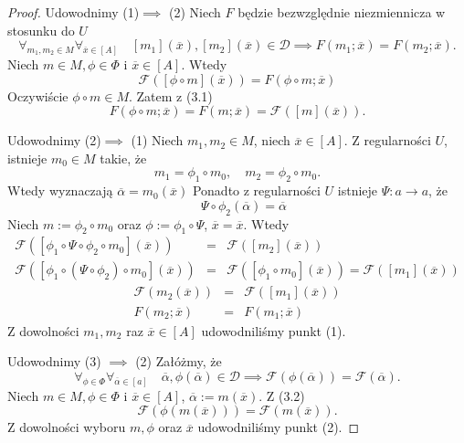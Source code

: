\documentclass[12pt,a4paper]{report}
\newcommand{\domkniecie}[1]{\left\lbrack{#1}\right\rbrack}
\begin{document}
\begin{proof}
Udowodnimy (1)$\implies$ (2)
Niech $F$ będzie bezwzględnie niezmiennicza w stosunku do $U$
\begin{equation}
\forall_{m_{1}, m_{2} \in M}  \forall_{\overline{x} \in \domkniecie{A}} \quad \domkniecie{m_1}(\overline{x}), \domkniecie{m_2}(\overline{x})\in \mathcal{D} \implies F(m_{1};\overline{x})=F(m_{2};\overline{x}).
\end{equation}
Niech $m \in M, \phi \in \Phi$ i $\overline{x} \in \domkniecie{A}$. Wtedy
$$
\mathcal{F}(\domkniecie{\phi \circ m}(\overline{x}))=F(\phi \circ m;\overline{x})
$$
Oczywiście $\phi \circ m \in M$. Zatem z (3.1)
$$
F(\phi \circ m; \overline{x})=F(m;\overline{x})=\mathcal{F}(\domkniecie{m}(\overline{x})).
$$

Udowodnimy (2)$\implies$ (1)
Niech $m_1,m_2 \in M$, niech $\overline{x} \in\domkniecie{A}$.
Z regularności $U$, istnieje $m_0\in M$ takie, że
$$
m_1=\phi_1\circ m_0, \quad m_2=\phi_2\circ m_0.
$$
Wtedy wyznaczają $\overline{\alpha}=m_0(\overline{x})$
Ponadto z regularności $U$ istnieje $\Psi:a\to a$, że
$$
\quad \Psi\circ \phi_2(\overline{\alpha})=\overline{\alpha}
$$
Niech $m:=\phi_2\circ m_0$ oraz $\phi:=\phi_1\circ\Psi$, $\overline{x}=\overline{x}$. Wtedy
\begin{eqnarray*}
\mathcal{F}(\domkniecie{\phi_1\circ \Psi\circ \phi_2 \circ m_0}(\overline{x})) & = & \mathcal{F}(\domkniecie{m_2}(\overline{x})) \\
\mathcal{F}(\domkniecie{\phi_1\circ(\Psi\circ \phi_2)\circ m_0}(\overline{x})) & = & \mathcal{F}(\domkniecie{\phi_1\circ m_0}(\overline{x})) = \mathcal{F}(\domkniecie{m_1}(\overline{x}))
\end{eqnarray*}
\begin{eqnarray*}
\mathcal{F}(m_2(\overline{x})) & = & \mathcal{F}(\domkniecie{m_1}(\overline{x}))\\
F(m_2;\overline{x}) & = & F(m_1;\overline{x})
\end{eqnarray*}
Z dowolności $m_1,m_2$ raz $\overline{x} \in \domkniecie{A}$ udowodniliśmy punkt (1).

Udowodnimy (3) $\implies$ (2)
Załóżmy, że
\begin{equation}
\forall_{\phi \in \Phi} \forall_{\overline{\alpha} \in \domkniecie{a}} \quad \overline{\alpha}, \phi(\overline{\alpha})\in \mathcal{D} \implies \mathcal{F}(\phi(\overline{\alpha}))=\mathcal{F}(\overline{\alpha}).
\end{equation}
Niech $m\in M, \phi \in \Phi$ i $\overline{x} \in\domkniecie{A}$, $\overline{\alpha}:=m(\overline{x})$. Z (3.2)
$$
 \mathcal{F}(\phi(m(\overline{x})))=\mathcal{F}(m(\overline{x})).
$$
Z dowolności wyboru $m, \phi$ oraz $\overline{x}$ udowodniliśmy punkt (2).


\end{proof}
\end{document}
